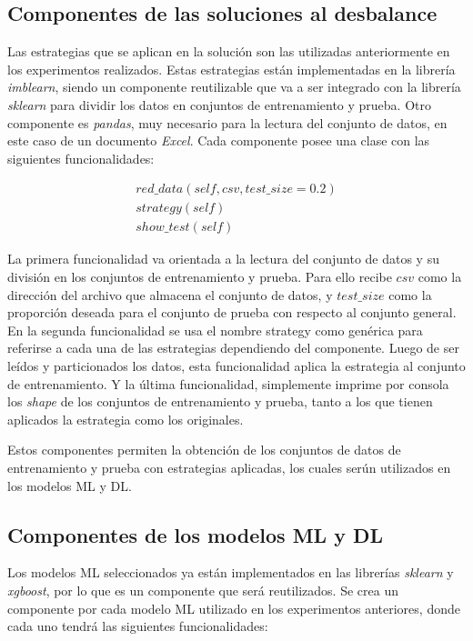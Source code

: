   \subsection{Componentes de las soluciones al desbalance}
    Las estrategias que se aplican en la soluci\'{o}n son las utilizadas anteriormente en los experimentos realizados. Estas estrategias est\'{a}n implementadas en la librer\'{i}a \textit{imblearn}, siendo un componente reutilizable que va a ser integrado con la librer\'{i}a \textit{sklearn} para dividir los datos en conjuntos de entrenamiento y prueba. Otro componente es \textit{pandas}, muy necesario para la lectura del conjunto de datos, en este caso de un documento \textit{Excel}. Cada componente posee una clase con las siguientes funcionalidades:
    
    \begin{align}
    	 red\_data(self,csv,test\_size=0.2)\\
    	 strategy(self)\\
    	 show\_test(self) 
    \end{align}
    
    
    La primera funcionalidad va orientada a la lectura del conjunto de datos y su divisi\'{o}n en los conjuntos de entrenamiento y prueba. Para ello recibe $csv$ como la direcci\'{o}n del archivo que almacena el conjunto de datos, y $test\_size$ como la proporci\'{o}n deseada para el conjunto de prueba con respecto al conjunto general. En la segunda funcionalidad se usa el nombre strategy como gen\'{e}rica para referirse a cada una de las estrategias dependiendo del componente. Luego de ser le\'{i}dos y particionados los datos, esta funcionalidad aplica la estrategia al conjunto de entrenamiento. Y la \'{u}ltima funcionalidad, simplemente imprime por consola los \textit{shape} de los conjuntos de entrenamiento y prueba, tanto a los que tienen aplicados la estrategia como los originales.
    
    Estos componentes permiten la obtenci\'{o}n de los conjuntos de datos de entrenamiento y prueba con estrategias aplicadas, los cuales ser\'{u}n utilizados en los modelos ML y DL.
  
  \subsection{Componentes de los modelos ML y DL}
  
    Los modelos ML seleccionados ya est\'{a}n implementados en las librer\'{i}as \textit{sklearn} y \textit{xgboost}, por lo que es un componente que ser\'{a} reutilizados. Se crea un componente por cada modelo ML utilizado en los experimentos anteriores, donde cada uno tendr\'{a} las siguientes funcionalidades:
    
